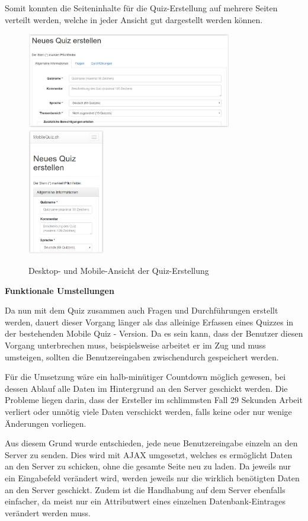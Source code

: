 Somit konnten die Seiteninhalte für die Quiz-Erstellung auf mehrere Seiten verteilt werden, welche in jeder Ansicht gut dargestellt werden können.


\begin{figure}[H]
	\centering
	\includegraphics[width=0.8\textwidth]{Images/Quiz_Erstellen1.PNG}
	\includegraphics[width=0.3\textwidth]{Images/Quiz_Erstellen_Mobile.PNG}
	\caption{Desktop- und Mobile-Ansicht der Quiz-Erstellung}
\end{figure}

\bigskip
\textbf{Funktionale Umstellungen}
\bigskip

Da nun mit dem Quiz zusammen auch Fragen und Durchführungen erstellt werden, dauert dieser Vorgang länger als das alleinige Erfassen eines Quizzes in der bestehenden Mobile Quiz - Version. Da es sein kann, dass der Benutzer diesen Vorgang unterbrechen muss, beispielsweise arbeitet er im Zug und muss umsteigen, sollten die Benutzereingaben zwischendurch gespeichert werden.

Für die Umsetzung wäre ein halb-minütiger Countdown möglich gewesen, bei dessen Ablauf alle Daten im Hintergrund an den Server geschickt werden. Die Probleme liegen darin, dass der Ersteller im schlimmsten Fall 29 Sekunden Arbeit verliert oder unnötig viele Daten verschickt werden, falls keine oder nur wenige Änderungen vorliegen.

Aus diesem Grund wurde entschieden, jede neue Benutzereingabe einzeln an den Server zu senden. Dies wird mit \acrfull{AJAX} umgesetzt, welches es ermöglicht Daten an den Server zu schicken, ohne die gesamte Seite neu zu laden. Da jeweils nur ein Eingabefeld verändert wird, werden jeweils nur die wirklich benötigten Daten an den Server geschickt. Zudem ist die Handhabung auf dem Server ebenfalls einfacher, da meist nur ein Attributwert eines einzelnen Datenbank-Eintrages verändert werden muss.

